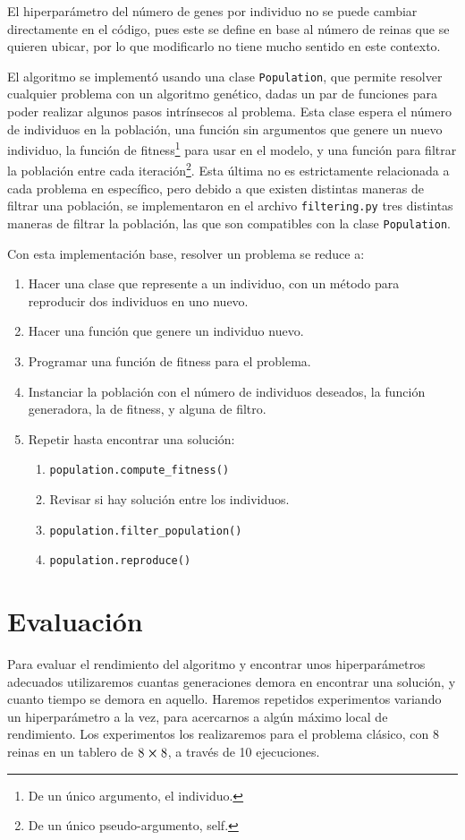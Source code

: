 \documentclass[letterpaper,11pt]{article} %
\begin{document}
  El hiperparámetro del número de genes por individuo no se puede cambiar directamente en el código, pues este se define en base al número de reinas que se quieren ubicar, por lo que modificarlo no tiene mucho sentido en este contexto.

  El algoritmo se implementó usando una clase \texttt{Population}, que permite resolver cualquier problema con un algoritmo genético, dadas un par de funciones para poder realizar algunos pasos intrínsecos al problema. Esta clase espera el número de individuos en la población, una función sin argumentos que genere un nuevo individuo, la función de fitness\footnote{De un único argumento, el individuo.} para usar en el modelo, y una función para filtrar la población entre cada iteración\footnote{De un único pseudo-argumento, self.}. Esta última no es estrictamente relacionada a cada problema en específico, pero debido a que existen distintas maneras de filtrar una población, se implementaron en el archivo \texttt{filtering.py} tres distintas maneras de filtrar la población, las que son compatibles con la clase \texttt{Population}.

  Con esta implementación base, resolver un problema se reduce a:
  \begin{enumerate}
    \item Hacer una clase que represente a un individuo, con un método para reproducir dos individuos en uno nuevo.
    \item Hacer una función que genere un individuo nuevo.
    \item Programar una función de fitness para el problema.
    \item Instanciar la población con el número de individuos deseados, la función generadora, la de fitness, y alguna de filtro.
    \item Repetir hasta encontrar una solución:
    \begin{enumerate}
      \item \texttt{population.compute\_fitness()}
      \item Revisar si hay solución entre los individuos.
      \item \texttt{population.filter\_population()}
      \item \texttt{population.reproduce()}
    \end{enumerate}
  \end{enumerate}

\section*{Evaluación}
  Para evaluar el rendimiento del algoritmo y encontrar unos hiperparámetros adecuados utilizaremos cuantas generaciones demora en encontrar una solución, y cuanto tiempo se demora en aquello. Haremos repetidos experimentos variando un hiperparámetro a la vez, para acercarnos a algún máximo local de rendimiento. Los experimentos los realizaremos para el problema clásico, con 8 reinas en un tablero de $8\cross 8$, a través de 10 ejecuciones.
\end{document}
